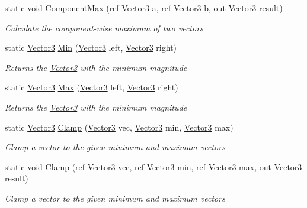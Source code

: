 \begin{DoxyCompactItemize}
static void \hyperlink{struct_open_t_k_1_1_vector3_aa88c04384ba37ee5822602423a0d9562}{Component\-Max} (ref \hyperlink{struct_open_t_k_1_1_vector3}{Vector3} a, ref \hyperlink{struct_open_t_k_1_1_vector3}{Vector3} b, out \hyperlink{struct_open_t_k_1_1_vector3}{Vector3} result)
\begin{DoxyCompactList}\small\item\em Calculate the component-\/wise maximum of two vectors \end{DoxyCompactList}\item 
static \hyperlink{struct_open_t_k_1_1_vector3}{Vector3} \hyperlink{struct_open_t_k_1_1_vector3_ad65dcd3130167d28974ce8ea24704aa8}{Min} (\hyperlink{struct_open_t_k_1_1_vector3}{Vector3} left, \hyperlink{struct_open_t_k_1_1_vector3}{Vector3} right)
\begin{DoxyCompactList}\small\item\em Returns the \hyperlink{struct_open_t_k_1_1_vector3}{Vector3} with the minimum magnitude \end{DoxyCompactList}\item 
static \hyperlink{struct_open_t_k_1_1_vector3}{Vector3} \hyperlink{struct_open_t_k_1_1_vector3_ac7e8845bd26cb39a33c189ba8c6329a9}{Max} (\hyperlink{struct_open_t_k_1_1_vector3}{Vector3} left, \hyperlink{struct_open_t_k_1_1_vector3}{Vector3} right)
\begin{DoxyCompactList}\small\item\em Returns the \hyperlink{struct_open_t_k_1_1_vector3}{Vector3} with the minimum magnitude \end{DoxyCompactList}\item 
static \hyperlink{struct_open_t_k_1_1_vector3}{Vector3} \hyperlink{struct_open_t_k_1_1_vector3_ae9bcdb3b51fe932e60891894e8c20ec1}{Clamp} (\hyperlink{struct_open_t_k_1_1_vector3}{Vector3} vec, \hyperlink{struct_open_t_k_1_1_vector3}{Vector3} min, \hyperlink{struct_open_t_k_1_1_vector3}{Vector3} max)
\begin{DoxyCompactList}\small\item\em Clamp a vector to the given minimum and maximum vectors \end{DoxyCompactList}\item 
static void \hyperlink{struct_open_t_k_1_1_vector3_aad4c3e6e66a1dbff3a62058e95fc4d96}{Clamp} (ref \hyperlink{struct_open_t_k_1_1_vector3}{Vector3} vec, ref \hyperlink{struct_open_t_k_1_1_vector3}{Vector3} min, ref \hyperlink{struct_open_t_k_1_1_vector3}{Vector3} max, out \hyperlink{struct_open_t_k_1_1_vector3}{Vector3} result)
\begin{DoxyCompactList}\small\item\em Clamp a vector to the given minimum and maximum vectors \end{DoxyCompactList}\item 

\end{DoxyCompactItemize}
